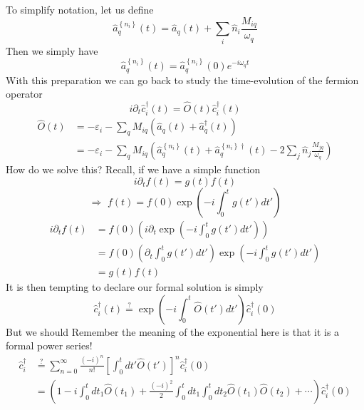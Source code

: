 To simplify notation, let us define
\[ \hat{a}_{q}^{\left\{ n_i \right\}}\left( t \right) =\hat{a}_q\left( t \right) +\sum_i{\hat{n}_i\frac{M_{iq}}{\omega _q}}\]
Then we simply have
\[ \hat{a}_{q}^{\left\{ n_i \right\}}\left( t \right) =\hat{a}_{q}^{\left\{ n_i \right\}}\left( 0 \right) e^{-i\omega _qt}\]
With this preparation we can go back to study the time-evolution of  the fermion operator
\[ i\partial _t\hat{c}_{i}^{\dagger}\left( t \right) =\hat{O}\left( t \right) \hat{c}_{i}^{\dagger}\left( t \right) \]
\begin{align*}
    \hat{O}\left( t \right) &=-\varepsilon _i-\sum_q{M_{iq}\left( \hat{a}_q\left( t \right) +\hat{a}_{q}^{\dagger}\left( t \right) \right)}\\
    &=-\varepsilon _i-\sum_q{M_{iq}\left( \hat{a}_{q}^{\left\{ n_i \right\}}\left( t \right) +\hat{a}_{q}^{\left\{ n_i \right\} \dagger}\left( t \right) -2\sum_j{\hat{n}_j\frac{M_{jq}}{\omega _q}} \right)}
\end{align*}
How do we solve this? Recall, if we have a simple function
\[ i\partial _tf\left( t \right) =g\left( t \right) f\left( t \right) \]
\[ \Rightarrow \,\,f\left( t \right) =f\left( 0 \right) \exp \left( -i\int_0^t{g\left( t' \right) dt'} \right) \]
\begin{align*}
    i\partial _tf\left( t \right) &=f\left( 0 \right) \left( i\partial _t\exp \left( -i\int_0^t{g\left( t' \right) dt'} \right) \right) \\
    &=f\left( 0 \right) \left( \partial _t\int_0^t{g\left( t' \right) dt'} \right) \exp \left( -i\int_0^t{g\left( t' \right) dt'} \right) \\
    &=g\left( t \right) f\left( t \right)
\end{align*}
It is then tempting to declare our formal solution is simply
\[ \hat{c}_{i}^{\dagger}\left( t \right) \stackrel{?}{=}\exp \left( -i\int_0^t{\hat{O}\left( t' \right) dt'} \right) \hat{c}_{i}^{\dagger}\left( 0 \right) \]
But we should Remember the meaning of the exponential here is that it is a formal power series!
\begin{align*}
    \hat{c}_{i}^{\dagger}&\stackrel{?}{=}\sum_{n=0}^{\infty}{\frac{\left( -i \right) ^n}{n!}\left[ \int_0^t{dt'\hat{O}\left( t' \right)} \right] ^n}\hat{c}_{i}^{\dagger}\left( 0 \right)\\
    &=\left( 1-i\int_0^t{dt_1\hat{O}\left( t_1 \right)}+\frac{\left( -i \right) ^2}{2}\int_0^t{dt_1\int_0^t{dt_2\hat{O}\left( t_1 \right) \hat{O}\left( t_2 \right)}}+\cdots \right) \hat{c}_{i}^{\dagger}\left( 0 \right)
\end{align*}

